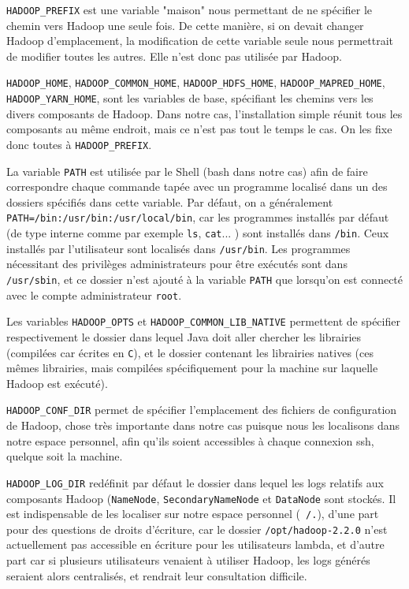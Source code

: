 \par \texttt{HADOOP\_PREFIX} est une variable "maison" nous permettant de ne spécifier le chemin vers Hadoop une seule fois. De cette manière, si on devait changer Hadoop d'emplacement, la modification de cette variable seule nous permettrait de modifier toutes les autres. Elle n'est donc pas utilisée par Hadoop.

\par \texttt{HADOOP\_HOME}, \texttt{HADOOP\_COMMON\_HOME},
\texttt{HADOOP\_HDFS\_HOME}, \texttt{HADOOP\_MAPRED\_HOME}, \\ \texttt{HADOOP\_YARN\_HOME}, sont les variables de base, spécifiant les chemins vers les divers composants de Hadoop. Dans notre cas, l'installation simple réunit tous les composants au même endroit, mais ce n'est pas tout le temps le cas. On les fixe donc toutes à \texttt{HADOOP\_PREFIX}.

\par La variable \texttt{PATH} est utilisée par le Shell (bash dans notre cas) afin de faire correspondre chaque commande tapée avec un programme localisé dans un des dossiers spécifiés dans cette variable. Par défaut, on a généralement \texttt{PATH=/bin:/usr/bin:/usr/local/bin}, car les programmes installés par défaut (de type interne comme par exemple \texttt{ls}, \texttt{cat}... ) sont installés dans \texttt{/bin}. Ceux installés par l'utilisateur sont localisés dans \texttt{/usr/bin}. Les programmes nécessitant des privilèges administrateurs pour être exécutés sont dans \texttt{/usr/sbin}, et ce dossier n'est ajouté à la variable \texttt{PATH} que lorsqu'on est connecté avec le compte administrateur \texttt{root}.

\par Les variables \texttt{HADOOP\_OPTS} et \texttt{HADOOP\_COMMON\_LIB\_NATIVE} permettent de spécifier respectivement le dossier dans lequel Java doit aller chercher les librairies (compilées car écrites en \texttt{C}), et le dossier contenant les librairies natives (ces mêmes librairies, mais compilées spécifiquement pour la machine sur laquelle Hadoop est exécuté).

\par \texttt{HADOOP\_CONF\_DIR} permet de spécifier l'emplacement des fichiers de configuration de Hadoop, chose très importante dans notre cas puisque nous les localisons dans notre espace personnel, afin qu'ils soient accessibles à chaque connexion ssh, quelque soit la machine.

\par \texttt{HADOOP\_LOG\_DIR} redéfinit par défaut le dossier dans lequel les logs relatifs aux composants Hadoop (\texttt{NameNode}, \texttt{SecondaryNameNode} et \texttt{DataNode} sont stockés. Il est indispensable de les localiser sur notre espace personnel (\texttt{~/.}), d'une part pour des questions de droits d'écriture, car le dossier \texttt{/opt/hadoop-2.2.0} n'est actuellement pas accessible en écriture pour les utilisateurs lambda, et d'autre part car si plusieurs utilisateurs venaient à utiliser Hadoop, les logs générés seraient alors centralisés, et rendrait leur consultation difficile.


